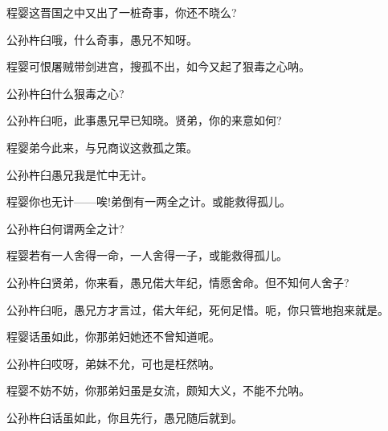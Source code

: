 {程婴\hspace{30pt}这晋国之中又出了一桩奇事，你还不晓么?

公孙杵臼\hspace{10pt}哦，什么奇事，愚兄不知呀。

程婴\hspace{30pt}可恨屠贼带剑进宫，搜孤不出，如今又起了狠毒之心呐。

公孙杵臼\hspace{10pt}什么狠毒之心?


公孙杵臼\hspace{10pt}呃，此事愚兄早已知晓。贤弟，你的来意如何?

程婴\hspace{30pt}弟今此来，与兄商议这救孤之策。

公孙杵臼\hspace{10pt}愚兄我是忙中无计。

程婴\hspace{30pt}你也无计------唉!弟倒有一两全之计。或能救得孤儿。

公孙杵臼\hspace{10pt}何谓两全之计?

程婴\hspace{30pt}若有一人舍得一命，一人舍得一子，或能救得孤儿。

公孙杵臼\hspace{10pt}贤弟，你来看，愚兄偌大年纪，情愿舍命。但不知何人舍子?


公孙杵臼\hspace{10pt}呃，愚兄方才言过，偌大年纪，死何足惜。呃，你只管地抱来就是。

程婴\hspace{30pt}话虽如此，你那弟妇她还不曾知道呢。

公孙杵臼\hspace{10pt}哎呀，弟妹不允，可也是枉然呐。

程婴\hspace{30pt}不妨不妨，你那弟妇虽是女流，颇知大义，不能不允呐。

公孙杵臼\hspace{10pt}话虽如此，你且先行，愚兄随后就到。

}
